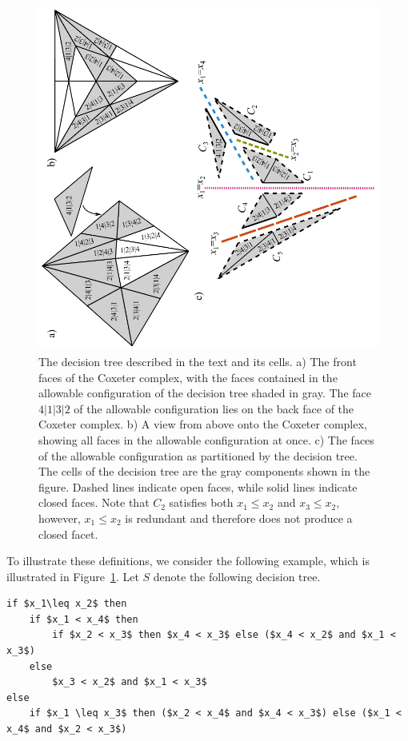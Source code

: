 \documentclass[12pt,reqno]{amsart}
\numberwithin{definition}{section}
\theoremstyle{definition}
\begin{document}
\begin{figure}[h]
\includegraphics[width=5in,angle=270]{cells.pdf}
\caption{The decision tree described in the text and its cells. a) The front faces of the Coxeter complex, with the faces contained in the allowable configuration of the decision tree shaded in gray. The face $4|1|3|2$ of the allowable configuration lies on the back face of the Coxeter complex. b) A view from above onto the Coxeter complex, showing all faces in the allowable configuration at once. c) The faces of the allowable configuration as partitioned by the decision tree. The cells of the decision tree are the gray components shown in the figure. Dashed lines indicate open faces, while solid lines indicate closed faces. Note that $C_2$ satisfies both $x_1 \leq x_2$ and $x_3 \leq x_2$, however, $x_1 \leq x_2$ is redundant and therefore does not produce a closed facet. }
\label{fig:decision-tree-with-cells}
\end{figure}

To illustrate these definitions, we consider the following example, which is illustrated in Figure~\ref{fig:decision-tree-with-cells}. Let $S$ denote the following decision tree.

\begin{lstlisting}[mathescape,basicstyle=\sffamily\small]
if $x_1\leq x_2$ then
    if $x_1 < x_4$ then
        if $x_2 < x_3$ then $x_4 < x_3$ else ($x_4 < x_2$ and $x_1 < x_3$)
    else
        $x_3 < x_2$ and $x_1 < x_3$
else
    if $x_1 \leq x_3$ then ($x_2 < x_4$ and $x_4 < x_3$) else ($x_1 < x_4$ and $x_2 < x_3$)
\end{lstlisting}
\end{document}
